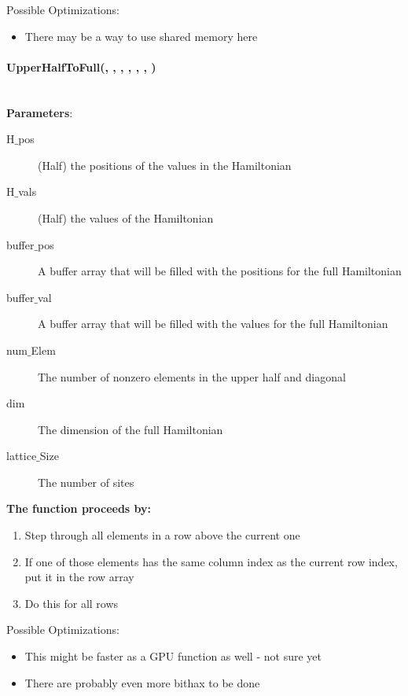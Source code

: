 \documentclass{article}
\begin{document}
Possible Optimizations:
\begin{itemize}
\item{There may be a way to use shared memory here}
\end{itemize}

\paragraph{\host \void UpperHalfToFull(\typelongtwoptr , \cuDoubleComplex , \typelongtwoptr , \cuDoubleComplex , \long , \long , \int ) \\ \\}  
\noindent\textbf{Parameters}:
\begin{description}
\item[\typelongtwoptr H$\_$pos] (Half) the positions of the values in the Hamiltonian
\item[\cuDoubleComplex H$\_$vals] (Half) the values of the Hamiltonian
\item[\typelongtwoptr buffer$\_$pos] A buffer array that will be filled with the positions for the full Hamiltonian
\item[\cuDoubleComplex buffer$\_$val] A buffer array that will be filled with the values for the full Hamiltonian
\item[\long num$\_$Elem] The number of nonzero elements in the upper half and diagonal
\item[\long dim] The dimension of the full Hamiltonian
\item[\int lattice$\_$Size] The number of sites
\end{description}

\noindent\textbf{The function proceeds by:}
\begin{enumerate}
\item{Step through all elements in a row above the current one}
\item{If one of those elements has the same column index as the current row index, put it in the row array}
\item{Do this for all rows}
\end{enumerate}

Possible Optimizations:
\begin{itemize}
\item{This might be faster as a GPU function as well - not sure yet}
\item{There are probably even more bithax to be done}
\end{itemize}
\end{document}

